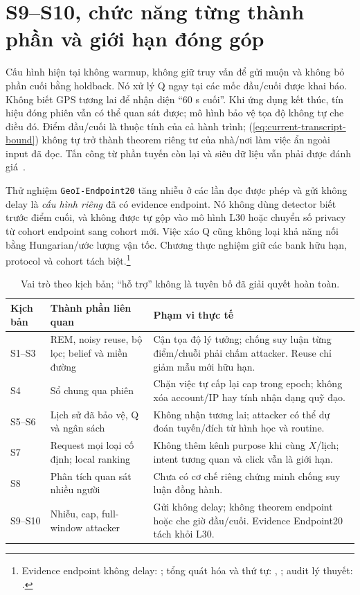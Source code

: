 \section{S9--S10, chức năng từng thành phần và giới hạn đóng góp}
\label{sec:current-endpoints-contribution}

Cấu hình hiện tại không warmup, không giữ truy vấn để gửi muộn và không bỏ phần cuối bằng holdback. Nó xử lý Q ngay tại các mốc đầu/cuối được khai báo. Không biết GPS tương lai để nhận diện ``60 s cuối''. Khi ứng dụng kết thúc, tín hiệu đóng phiên vẫn có thể quan sát được; mô hình bảo vệ tọa độ không tự che điều đó. Điểm đầu/cuối là thuộc tính của cả hành trình; (\ref{eq:current-transcript-bound}) không tự trở thành theorem riêng tư của nhà/nơi làm việc ẩn ngoài input đã đọc. Tấn công từ phần tuyến còn lại và siêu dữ liệu vẫn phải được đánh giá~\cite{dhondt2022endpoint}.

Thử nghiệm \texttt{GeoI-Endpoint20} tăng nhiễu ở các lần đọc được phép và gửi không delay là \emph{cấu hình riêng} đã có evidence endpoint. Nó không dùng detector biết trước điểm cuối, và không được tự gộp vào mô hình L30 hoặc chuyển số privacy từ cohort endpoint sang cohort mới. Việc xáo Q cũng không loại khả năng nối bằng Hungarian/ước lượng vận tốc. Chương thực nghiệm giữ các bank hữu hạn, protocol và cohort tách biệt.\footnote{Evidence endpoint không delay: ; tổng quát hóa và thứ tự: , ; audit lý thuyết: .}

\begin{table}[htbp]\centering\small
\caption{Vai trò theo kịch bản; ``hỗ trợ'' không là tuyên bố đã giải quyết hoàn toàn.}
\begin{tabularx}{\textwidth}{P{2.0cm}P{4.2cm}Y}\toprule
Kịch bản & Thành phần liên quan & Phạm vi thực tế\\\midrule
S1--S3 & REM, noisy reuse, bộ lọc; belief và miền đường & Cận tọa độ lý tưởng; chống suy luận từng điểm/chuỗi phải chấm attacker. Reuse chỉ giảm mẫu mới hữu hạn.\\
S4 & Sổ chung qua phiên & Chặn việc tự cấp lại cap trong epoch; không xóa account/IP hay tính nhận dạng quỹ đạo.\\
S5--S6 & Lịch sử đã bảo vệ, Q và ngân sách & Không nhận tương lai; attacker có thể dự đoán tuyến/đích từ hình học và routine.\\
S7 & Request mọi loại cố định; local ranking & Không thêm kênh purpose khi cùng $X$/lịch; intent tương quan và click vẫn là giới hạn.\\
S8 & Phân tích quan sát nhiều người & Chưa có cơ chế riêng chứng minh chống suy luận đồng hành.\\
S9--S10 & Nhiễu, cap, full-window attacker & Gửi không delay; không theorem endpoint hoặc che giờ đầu/cuối. Evidence Endpoint20 tách khỏi L30.\\\bottomrule
\end{tabularx}
\end{table}

